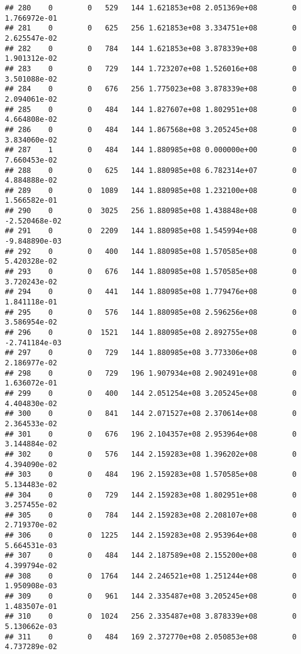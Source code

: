 \documentclass[
]{article}
\begin{document}
\begin{enumerate}
\begin{verbatim}
## 280    0        0   529   144 1.621853e+08 2.051369e+08        0  1.766972e-01
## 281    0        0   625   256 1.621853e+08 3.334751e+08        0  2.625547e-02
## 282    0        0   784   144 1.621853e+08 3.878339e+08        0  1.901312e-02
## 283    0        0   729   144 1.723207e+08 1.526016e+08        0  3.501088e-02
## 284    0        0   676   256 1.775023e+08 3.878339e+08        0  2.094061e-02
## 285    0        0   484   144 1.827607e+08 1.802951e+08        0  4.664808e-02
## 286    0        0   484   144 1.867568e+08 3.205245e+08        0  3.834060e-02
## 287    1        0   484   144 1.880985e+08 0.000000e+00        0  7.660453e-02
## 288    0        0   625   144 1.880985e+08 6.782314e+07        0  4.884888e-02
## 289    0        0  1089   144 1.880985e+08 1.232100e+08        0  1.566582e-01
## 290    0        0  3025   256 1.880985e+08 1.438848e+08        0 -2.520468e-02
## 291    0        0  2209   144 1.880985e+08 1.545994e+08        0 -9.848890e-03
## 292    0        0   400   144 1.880985e+08 1.570585e+08        0  5.420328e-02
## 293    0        0   676   144 1.880985e+08 1.570585e+08        0  3.720243e-02
## 294    0        0   441   144 1.880985e+08 1.779476e+08        0  1.841118e-01
## 295    0        0   576   144 1.880985e+08 2.596256e+08        0  3.586954e-02
## 296    0        0  1521   144 1.880985e+08 2.892755e+08        0 -2.741184e-03
## 297    0        0   729   144 1.880985e+08 3.773306e+08        0  2.186977e-02
## 298    0        0   729   196 1.907934e+08 2.902491e+08        0  1.636072e-01
## 299    0        0   400   144 2.051254e+08 3.205245e+08        0  4.404830e-02
## 300    0        0   841   144 2.071527e+08 2.370614e+08        0  2.364533e-02
## 301    0        0   676   196 2.104357e+08 2.953964e+08        0  3.144884e-02
## 302    0        0   576   144 2.159283e+08 1.396202e+08        0  4.394090e-02
## 303    0        0   484   196 2.159283e+08 1.570585e+08        0  5.134483e-02
## 304    0        0   729   144 2.159283e+08 1.802951e+08        0  3.257455e-02
## 305    0        0   784   144 2.159283e+08 2.208107e+08        0  2.719370e-02
## 306    0        0  1225   144 2.159283e+08 2.953964e+08        0  5.664531e-03
## 307    0        0   484   144 2.187589e+08 2.155200e+08        0  4.399794e-02
## 308    0        0  1764   144 2.246521e+08 1.251244e+08        0  1.950908e-03
## 309    0        0   961   144 2.335487e+08 3.205245e+08        0  1.483507e-01
## 310    0        0  1024   256 2.335487e+08 3.878339e+08        0  5.130662e-03
## 311    0        0   484   169 2.372770e+08 2.050853e+08        0  4.737289e-02

\end{verbatim}
\end{enumerate}
\end{document}
